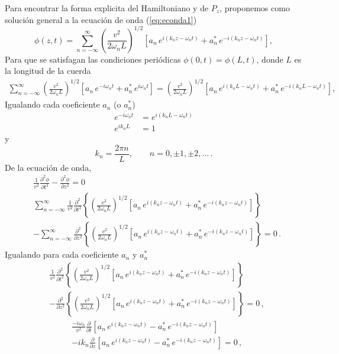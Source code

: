 Para encontrar la forma explicita del Hamiltoniano y de $P_z$,
proponemos como soluci\'on general a la ecuaci\'on de onda (\ref{eq:econda1}) 
\begin{equation}
  \label{eq:9}
  \phi(z,t)=\sum_{n=-\infty}^\infty\left(\frac{v^2}{2\omega_n L}\right)^{1/2}
  \left[a_n\,e^{i(k_n z-\omega_n t)}+a_n^*\,e^{-i(k_n z-\omega_n t)}\right],
\end{equation}
Para que se satisfagan las condiciones peri\'odicas $\phi(0,t)=\phi(L,t)$, donde $L$ es la longitud de la cuerda
\begin{align}
  \sum_{n=-\infty}^\infty 
  \left(\frac{v^2}{2\omega_n L}\right)^{1/2}
  \left[a_n\,e^{-i\omega_n t}+a_n^*\,e^{i\omega_n t}\right]=
  \left(\frac{v^2}{2\omega_n L}\right)^{1/2}
  \left[a_n\,e^{i(k_n L-\omega_n t)}+a_n^*\,e^{-i(k_n L-\omega_n t)}\right],
\end{align}
Igualando cada coeficiente $a_n$ (o $a_n^*$)
\begin{align}
  e^{-i\omega_nt}&=e^{i(k_nL-\omega_nt)}\nonumber\\
  e^{ik_nL}&=1
\end{align}
y
\begin{equation}
   k_n=\frac{2\pi n}{L},\qquad n=0,\pm1,\pm2,\ldots\,.
\end{equation}
De la ecuaci\'on de onda, 
\begin{align}
      &\frac{1}{v^2}\frac{\partial^2\phi}{\partial t^2}-\frac{\partial^2\phi}{\partial z^2}=0\,\nonumber\\
&\sum_{n=-\infty}^\infty\frac{1}{v^2}\frac{\partial^2}{\partial t^2}
\left\{\left(\frac{v^2}{2\omega_n L}\right)^{1/2}
  \left[a_n\,e^{i(k_n z-\omega_n t)}+a_n^*\,e^{-i(k_n z-\omega_n t)}\right]\right\}\nonumber\\ 
&-\sum_{n=-\infty}^\infty\frac{\partial^2}{\partial z^2}
\left\{\left(\frac{v^2}{2\omega_n L}\right)^{1/2}
  \left[a_n\,e^{i(k_n z-\omega_n t)}+a_n^*\,e^{-i(k_n z-\omega_n t)}\right]\right\}=0\,.
\end{align}
Igualando para cada coeficiente $a_n$ y $a_n^*$
\begin{align}
 &\frac{1}{v^2}\frac{\partial^2}{\partial t^2}
\left\{\left(\frac{v^2}{2\omega_n L}\right)^{1/2}
  \left[a_n\,e^{i(k_n z-\omega_n t)}+a_n^*\,e^{-i(k_n z-\omega_n t)}\right]\right\}\nonumber\\ 
&-\frac{\partial^2}{\partial z^2}
\left\{\left(\frac{v^2}{2\omega_n L}\right)^{1/2}
  \left[a_n\,e^{i(k_n z-\omega_n t)}+a_n^*\,e^{-i(k_n z-\omega_n t)}\right]\right\}=0\,,
\end{align}
\begin{align}
  &\frac{-i\omega_n}{v^2}\frac{\partial}{\partial t}\left[
      a_n\,e^{i(k_nz-\omega_n t)}-a_n^*\,e^{-i(k_nz-\omega_n t)}\right]\nonumber\\
  &-ik_n\frac{\partial}{\partial z}\left[
      a_n\,e^{i(k_nz-\omega_n t)}-a_n^*\,e^{-i(k_nz-\omega_n t)}\right]=0\,,
\end{align}

